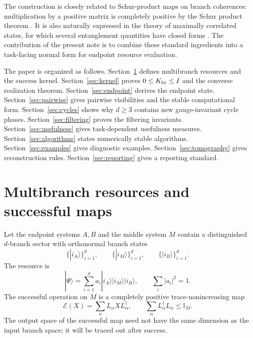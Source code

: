 \documentclass[reprint,aps,pra,superscriptaddress,nofootinbib,longbibliography]{revtex4-2}
\newcommand{\ket}[1]{|#1\rangle}
\newcommand{\Id}{\mathbb I}
\newcommand{\EE}{\mathcal E}
\begin{document}
The construction is closely related to Schur-product maps on branch coherences: multiplication by a positive matrix is completely positive by the Schur product theorem \cite{Schur1911,HornJohnson2013}.  It is also naturally expressed in the theory of maximally correlated states, for which several entanglement quantities have closed forms \cite{Rains1999,VidalWerner2002}.  The contribution of the present note is to combine these standard ingredients into a task-facing normal form for endpoint resource evaluation.

The paper is organized as follows.  Section~\ref{sec:setup} defines multibranch resources and the success kernel.  Section~\ref{sec:kernel} proves \(0\le K_{\rm br}\le I\) and the converse realization theorem.  Section~\ref{sec:endpoint} derives the endpoint state.  Section~\ref{sec:pairwise} gives pairwise visibilities and the stable computational form.  Section~\ref{sec:cycles} shows why \(d\ge3\) contains new gauge-invariant cycle phases.  Section~\ref{sec:filtering} proves the filtering invariants.  Section~\ref{sec:usefulness} gives task-dependent usefulness measures.  Section~\ref{sec:algorithms} states numerically stable algorithms.  Section~\ref{sec:examples} gives diagnostic examples.  Section~\ref{sec:tomography} gives reconstruction rules.  Section~\ref{sec:reporting} gives a reporting standard.

\section{Multibranch resources and successful maps}
\label{sec:setup}

Let the endpoint systems \(A,B\) and the middle system \(M\) contain a distinguished \(d\)-branch sector with orthonormal branch states
\[
\{\ket{i_A}\}_{i=1}^d,\qquad
\{\ket{i_M}\}_{i=1}^d,\qquad
\{\ket{i_B}\}_{i=1}^d.
\]
The resource is
\begin{equation}
\ket{\Psi}
=
\sum_{i=1}^d a_i
\ket{i_A}\ket{i_M}\ket{i_B},
\qquad
\sum_i |a_i|^2=1.
\label{eq:resource}
\end{equation}
The successful operation on \(M\) is a completely positive trace-nonincreasing map
\begin{equation}
\EE(X)=\sum_\alpha L_\alpha X L_\alpha^\dagger,
\qquad
\sum_\alpha L_\alpha^\dagger L_\alpha\le \Id_M.
\label{eq:cp-tni}
\end{equation}
The output space of the successful map need not have the same dimension as the input branch space; it will be traced out after success.
\end{document}
